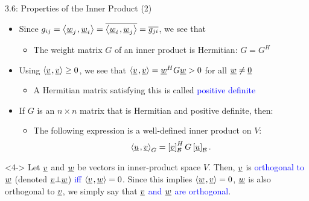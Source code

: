 \documentclass[10pt,english,aspectratio=169]{beamer}
\begin{document}
\begin{frame}{3.6: Properties of the Inner Product (2)}

\begin{itemize}
\item<1-> Since $g_{ij} = {\left\langle  \underline{w}_j  \mskip2mu ,  \underline{w}_i  \right\rangle} = \overline{{\left\langle  \underline{w}_i  \mskip2mu ,  \underline{w}_j  \right\rangle}} = \overline{g_{ji}}$, we see that
\begin{itemize}
\item The weight matrix $G$ of an inner product is Hermitian: $G = G^H$
\end{itemize}

\vspace{1mm}
\item<2-> Using ${\left\langle  \underline{v}  \mskip2mu ,  \underline{v}  \right\rangle} \geq 0$, we see that ${\left\langle  \underline{v}  \mskip2mu ,  \underline{v}  \right\rangle} = \underline{w}^H G \underline{w} > 0$ for all $\underline{w} \neq \underline{0}$ \vspace{0.5mm}
\begin{itemize}
\item A Hermitian matrix satisfying this is called  \textcolor{blue}{positive definite} 

\end{itemize}

\vspace{1mm}
\item<3-> If $G$ is an $n \times n$ matrix that is Hermitian and positive definite, then:
\begin{itemize}
\item The following expression is a well-defined inner product on $V$:
\begin{equation*}
{\left\langle  \underline{u}  \mskip2mu ,  \underline{v}  \right\rangle}_G
= \left[ \underline{v} \right]_{\mathcal{B}}^H G \left[ \underline{u} \right]_{\mathcal{B}}.
\end{equation*}
\end{itemize}

\end{itemize}

\begin{definition}[Orthogonal]<4->
Let $\underline{v}$ and $\underline{w}$ be vectors in inner-product space $V$.
Then, $\underline{v}$ is \textcolor{blue}{orthogonal to $\underline{w}$} (denoted $\underline{v} \bot \underline{w}$) \textcolor{blue}{iff ${\left\langle  \underline{v}  \mskip2mu ,  \underline{w}  \right\rangle} = 0$}.
Since this implies ${\left\langle  \underline{w}  \mskip2mu ,  \underline{v}  \right\rangle} = 0$, $\underline{w}$ is also orthogonal to $\underline{v}$, we simply say that \textcolor{blue}{$\underline{v}$ and $\underline{w}$ are orthogonal}.
\end{definition}

\end{frame}
\end{document}

